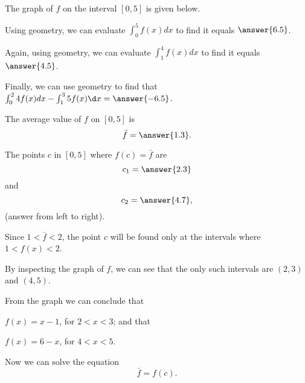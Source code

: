 \documentclass{ximera}
\author{Nela Lakos \and Kyle Parsons}
\begin{document}
\begin{exercise}

The graph of $f$ on the interval $[0,5]$ is given below.

\begin{image}
\end{image}

Using geometry, we can evaluate $\int_0^5 f(x) dx$ to find it equals  $\answer{6.5}$.

Again, using geometry, we can evaluate $\int_1^4 f(x) dx$ to find it equals  $\answer{4.5}$.

Finally, we can use geometry to find that  $\int_0^2 4f(x) dx - \int_1^3 5f(x) \d x = \answer{-6.5}$.

The average value of $f$ on $[0,5]$ is 
\[
\bar{f} = \answer{1.3}.
\]

The points $c$ in $[0,5]$ where $f(c) = \bar{f}$ are 
\[
c_1=\answer{2.3}
\]
 and
  \[
  c_2=\answer{4.7},
  \]
   (answer from left to right).
   
\begin{hint}

Since $1<\bar{f}<2$, the point $c$ will be found only at the intervals where $1<f(x)<2$.

By inspecting the graph of $f$, we can see that the only such intervals  are $(2,3)$ and $(4,5)$.


From the graph we can conclude that

 $f(x)=x-1$, for  $2<x<3$; and that
 
 
 $f(x)=6-x$, for $4<x<5$.
 

Now we can solve the equation
\[
\bar{f} =f(c).
\]
\end{hint}
\end{exercise}
\end{document}
